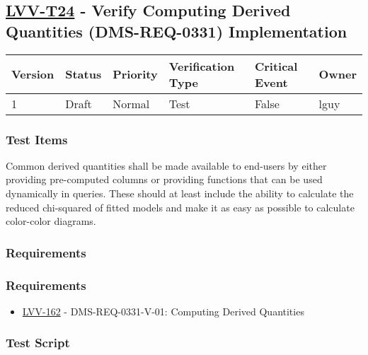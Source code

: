 \hypertarget{lvv-t24---verify-computing-derived-quantities-dms-req-0331-implementation}{%
\subsection{\texorpdfstring{\href{https://jira.lsstcorp.org/secure/Tests.jspa\#/testCase/LVV-T24}{LVV-T24}
- Verify Computing Derived Quantities (DMS-REQ-0331)
Implementation}{LVV-T24 - Verify Computing Derived Quantities (DMS-REQ-0331) Implementation}}\label{lvv-t24---verify-computing-derived-quantities-dms-req-0331-implementation}}

\begin{longtable}[]{@{}llllll@{}}
\toprule
Version & Status & Priority & Verification Type & Critical Event &
Owner\tabularnewline
\midrule
\endhead
1 & Draft & Normal & Test & False & lguy\tabularnewline
\bottomrule
\end{longtable}

\hypertarget{test-items-9}{%
\subsubsection{Test Items}\label{test-items-9}}

Common derived quantities shall be made available to end-users by either
providing pre-computed columns or providing functions that can be used
dynamically in queries. These should at least include the ability to
calculate the reduced chi-squared of fitted models and make it as easy
as possible to calculate color-color diagrams.

\hypertarget{requirements-18}{%
\subsubsection{Requirements}\label{requirements-18}}

\hypertarget{requirements-19}{%
\subsubsection{Requirements}\label{requirements-19}}

\begin{itemize}
\tightlist
\item
  \href{https://jira.lsstcorp.org/browse/LVV-162}{LVV-162} -
  DMS-REQ-0331-V-01: Computing Derived Quantities
\end{itemize}

\hypertarget{test-script-9}{%
\subsubsection{Test Script}\label{test-script-9}}

